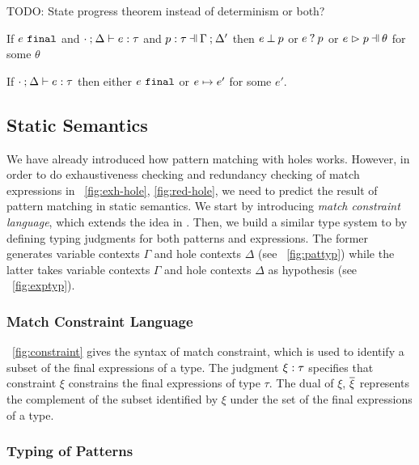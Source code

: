 \documentclass[runningheads,envcountsame,a4paper]{llncs}
\newcommand{\todo}[1]{{\color{red} TODO: #1}}
\begin{document}
\todo{State progress theorem instead of determinism or both?}

\begin{lemma}
  \label{lem:match-progress}
  If $e ~\mathtt{final}$ and $\cdot \mathbin{;} \Delta \vdash e : \tau$ and $\hpattyp{p}{\tau}{\Gamma}{\Delta'}$
  then $e \mathbin{\bot} p$ or $e \mathbin{?} p$ or $\hpatmatch{e}{p}{\theta}$ for some $\theta$
\end{lemma}

\begin{theorem}[Progress]
  \label{thrm:progress}
  If $\cdot \mathbin{;} \Delta \vdash e : \tau$ then either $e ~\mathtt{final}$ or $e \mapsto e'$ for some $e'$.
\end{theorem}

\subsection{Static Semantics}\label{sec:statics}

We have already introduced how pattern matching with holes works. However, in order to do exhaustiveness checking and redundancy
checking of match expressions in \listfigurename~\ref{fig:exh-hole},
\ref{fig:red-hole}, we need to predict the result of pattern matching in static
semantics. We start by introducing \textit{match constraint language}, which
extends the idea in \cite{Harper2012}. Then, we build a similar type system to
\cite{DBLP:journals/pacmpl/OmarVCH19} by defining typing judgments for both
patterns and expressions. The former generates variable contexts $\Gamma$ and
hole contexts $\Delta$ (see \figurename~\ref{fig:pattyp}) while the latter 
takes variable contexts $\Gamma$ and hole contexts $\Delta$ as hypothesis (see
\figurename~\ref{fig:exptyp}).

\subsubsection{Match Constraint Language}\label{sec:constraint}


\figurename~\ref{fig:constraint} gives the syntax of match constraint, which is
used to identify a subset of the final expressions of a type. The judgment
$\xi : \tau$ specifies that constraint $\xi$ constrains the final
expressions of type $\tau$. The dual of $\xi$, $\overline{\xi}$ represents the
complement of the subset identified by $\xi$ under the set of the final
expressions of a type.

\subsubsection{Typing of Patterns}

\end{document}
